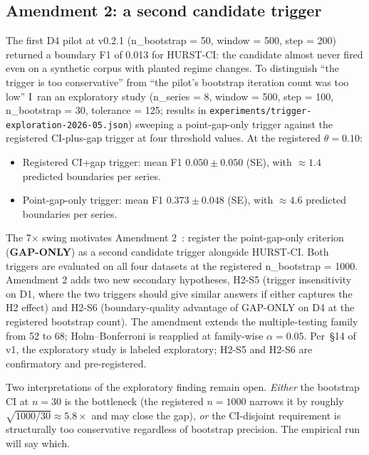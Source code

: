 \documentclass[11pt]{article}
\begin{document}
\subsection{Amendment 2: a second candidate trigger}
\label{sec:amendment2}

The first D4 pilot at v0.2.1 (n\_bootstrap = 50, window = 500, step = 200) returned a boundary F1 of 0.013 for HURST-CI: the candidate almost never fired even on a synthetic corpus with planted regime changes. To distinguish ``the trigger is too conservative'' from ``the pilot's bootstrap iteration count was too low'' I~ran an exploratory study (n\_series = 8, window = 500, step = 100, n\_bootstrap = 30, tolerance = 125; results in \texttt{experiments/trigger-exploration-2026-05.json}) sweeping a point-gap-only trigger against the registered CI-plus-gap trigger at four threshold values. At the registered $\theta = 0.10$:

\begin{itemize}
\item Registered CI+gap trigger: mean F1 $0.050 \pm 0.050$ (SE), with $\approx 1.4$ predicted boundaries per series.
\item Point-gap-only trigger: mean F1 $0.373 \pm 0.048$ (SE), with $\approx 4.6$ predicted boundaries per series.
\end{itemize}

The 7$\times$ swing motivates Amendment 2~\cite{malempatihari2026amendment2}: register the point-gap-only criterion (\textbf{GAP-ONLY}) as a second candidate trigger alongside HURST-CI. Both triggers are evaluated on all four datasets at the registered n\_bootstrap = 1000. Amendment 2 adds two new secondary hypotheses, H2-S5 (trigger insensitivity on D1, where the two triggers should give similar answers if either captures the H2 effect) and H2-S6 (boundary-quality advantage of GAP-ONLY on D4 at the registered bootstrap count). The amendment extends the multiple-testing family from 52 to 68; Holm--Bonferroni is reapplied at family-wise $\alpha = 0.05$. Per~\S14 of v1, the exploratory study is labeled exploratory; H2-S5 and H2-S6 are confirmatory and pre-registered.

Two interpretations of the exploratory finding remain open. \emph{Either} the bootstrap CI at $n=30$ is the bottleneck (the registered $n=1000$ narrows it by roughly $\sqrt{1000/30}\approx 5.8\times$ and may close the gap), \emph{or} the CI-disjoint requirement is structurally too conservative regardless of bootstrap precision. The empirical run will say which.
\end{document}
